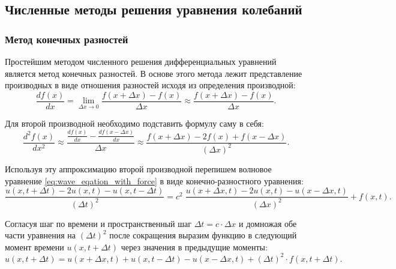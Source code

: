 \documentclass[12pt,a4paper,russian]{report}
\begin{document}
	
	\subsection{Численные методы решения уравнения колебаний}
	
	
	\subsubsection{Метод конечных разностей}
	
	Простейшим методом численного решения дифференциальных уравнений является метод конечных разностей. В основе этого метода лежит представление производных в виде отношения разностей исходя из определения производной:
	\begin{equation*}
		\frac{df(x)}{dx} = \lim\limits_{\Delta x \rightarrow 0} \frac{f(x + \Delta x) - f(x)}{\Delta x} \approx
		\frac{f(x + \Delta x) - f(x)}{\Delta x}.
	\end{equation*}
	
	Для второй производной необходимо подставить формулу саму в себя:
	\begin{equation} \label{eq:second_derivative}
		\frac{d^2 f(x)}{dx^2} \approx
		\frac{ \frac{df(x)}{dx} - \frac{df(x - \Delta x)}{dx}}{\Delta x} \approx
		\frac{ f(x + \Delta x) - 2 f(x) + f(x - \Delta x) }{\left( \Delta x \right) ^2}.
	\end{equation}
	
	Используя эту аппроксимацию второй производной перепишем волновое уравнение \eqref{eq:wave_eqation_with_force} в виде конечно-разностного уравнения:
	\begin{equation*}
		\frac{u(x, t + \Delta t) - 2 u(x, t) - u(x, t - \Delta t)}{\left( \Delta t \right) ^2} = 
		c^2 \; \frac{u(x + \Delta x, t) - 2 u(x, t) - u(x - \Delta x, t)}{\left( \Delta x \right) ^2} + f(x, t).
	\end{equation*}
	
	Согласуя шаг по времени и пространственный шаг $\Delta t = c \cdot \Delta x$ и домножая обе части уравнения на $ \left( \Delta t \right)^2 $ после сокращения выразим функцию в следующий момент времени $u(x, t + \Delta t)$ через значения в предыдущие моменты:
	\begin{equation*}		
		u(x, t + \Delta t) = u(x + \Delta x, t) + u(x, t - \Delta t) - u(x - \Delta x, t) + \left( \Delta t \right)^2 \cdot f(x, t + \Delta t).		
	\end{equation*}
	
\end{document}

